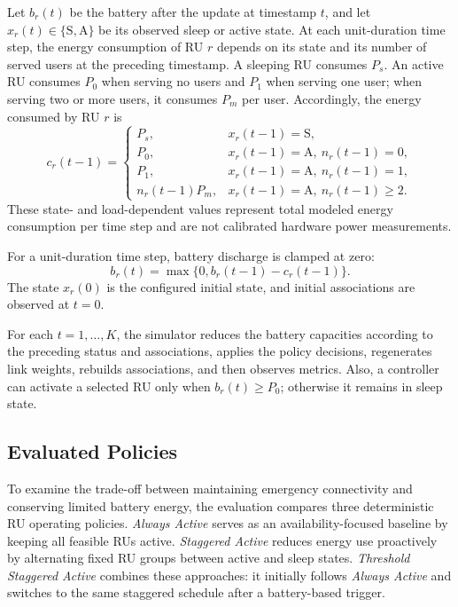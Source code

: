 Let \(b_r(t)\) be the battery after the update at timestamp \(t\), and let \(x_r(t)\in\{\mathrm{S},\mathrm{A}\}\) be its observed sleep or active state. At each unit-duration time step, the energy consumption of RU \(r\) depends on its state and its number of served users at the preceding timestamp. A sleeping RU consumes \(P_s\). An active RU consumes \(P_0\) when serving no users and \(P_1\) when serving one user; when serving two or more users, it consumes \(P_m\) per user. Accordingly, the energy consumed by RU \(r\) is
\begin{equation}
 c_r(t-1)=
 \begin{cases}
 P_s, & x_r(t-1)=\mathrm{S},\\
 P_0, & x_r(t-1)=\mathrm{A},\ n_r(t-1)=0,\\
 P_1, & x_r(t-1)=\mathrm{A},\ n_r(t-1)=1,\\
 n_r(t-1)P_m, & x_r(t-1)=\mathrm{A},\ n_r(t-1)\geq2.
 \end{cases}
 \label{eq:ru-consumption}
\end{equation}
These state- and load-dependent values represent total modeled energy consumption per time step and are not calibrated hardware power measurements.

For a unit-duration time step, battery discharge is clamped at zero:
\begin{equation}
 b_r(t)=\max\{0,b_r(t-1)-c_r(t-1)\}.
 \label{eq:battery-update}
\end{equation}
The state \(x_r(0)\) is the configured initial state, and initial associations are observed at \(t=0\).

For each \(t=1,\ldots,K\), the simulator reduces the battery capacities according to the preceding status and associations, applies the policy decisions,  regenerates link weights, rebuilds associations, and then observes metrics.   Also, a controller can activate a selected RU only when \(b_r(t)\geq P_0\); otherwise it remains in sleep state.

\subsection{Evaluated Policies}

To examine the trade-off between maintaining emergency connectivity and conserving limited battery energy, the evaluation compares three deterministic RU operating policies. \emph{Always Active} serves as an availability-focused baseline by keeping all feasible RUs active. \emph{Staggered Active} reduces energy use proactively by alternating fixed RU groups between active and sleep states. \emph{Threshold Staggered Active} combines these approaches: it initially follows \emph{Always Active} and switches to the same staggered schedule after a battery-based trigger.

